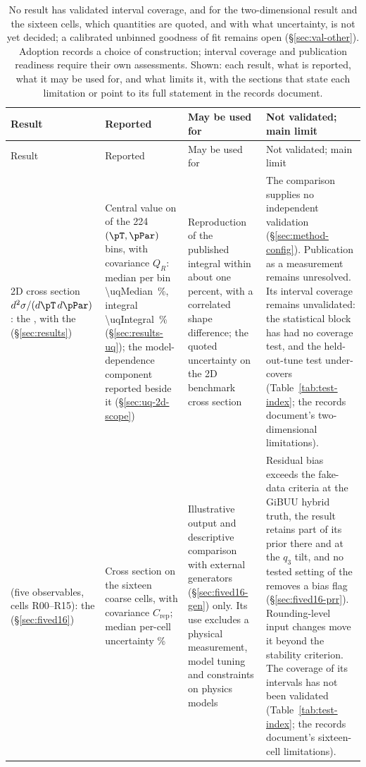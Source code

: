\begingroup\setlength{\LTcapwidth}{\textwidth}
\begin{xltabular}{\textwidth}{@{}>{\footnotesize\RaggedRight\arraybackslash{}\hsize}X>{\footnotesize\RaggedRight\arraybackslash{}\hsize}X>{\footnotesize\RaggedRight\arraybackslash{}\hsize}X>{\footnotesize\RaggedRight\arraybackslash{}\hsize}X@{}}
\caption[Results and their validity]{No result has validated interval coverage, and for the two-dimensional result and the sixteen cells, which quantities are quoted, and with what uncertainty, is not yet decided; a calibrated unbinned goodness of fit remains open (\S\ref{sec:val-other}). Adoption records a choice of construction; interval coverage and publication readiness require their own assessments. Shown: each result, what is reported, what it may be used for, and what limits it, with the sections that state each limitation or point to its full statement in the records document.}
\label{tab:validity}\label{tab:result-status}\\
\toprule Result & Reported & May be used for & Not validated; main limit \\
\midrule \endfirsthead \toprule Result & Reported & May be used for & Not validated; main limit \\
\midrule \endhead \bottomrule \endlastfoot 2D cross section $d^{2}\sigma/(d\pT\,d\pPar)$: the \estTwoD{}, with the \estExact{} (\S\ref{sec:results}) & Central value on  of the 224 $(\pT,\pPar)$ bins, with covariance $Q_R$: median per bin \SI{\uqMedian}{\percent}, integral \SI{\uqIntegral}{\percent} (\S\ref{sec:results-uq}); the model-dependence component reported beside it (\S\ref{sec:uq-2d-scope}) & Reproduction of the published integral within about one percent, with a correlated shape difference; the quoted uncertainty on the 2D benchmark cross section & The comparison supplies no independent validation (\S\ref{sec:method-config}). Publication as a measurement remains unresolved. Its interval coverage remains unvalidated: the statistical block has had no coverage test, and the held-out-tune test under-covers (Table~\ref{tab:test-index}; the records document's two-dimensional limitations). \\
\addlinespace \resSixteen{} (five observables, cells R00--R15): the \estMultiD{} (\S\ref{sec:fived16}) & Cross section on the sixteen coarse cells, with covariance $C_{\mathrm{rep}}$; median per-cell uncertainty \% & Illustrative output and descriptive comparison with external generators (\S\ref{sec:fived16-gen}) only. Its use excludes a physical measurement, model tuning and constraints on physics models & Residual bias exceeds the fake-data criteria at the GiBUU hybrid truth, the result retains part of its prior there and at the $q_3$ tilt, and no tested setting of the \estMultiD{} removes a bias flag (\S\ref{sec:fived16-prr}). Rounding-level input changes move it beyond the stability criterion. The coverage of its intervals has not been validated (Table~\ref{tab:test-index}; the records document's sixteen-cell limitations). \\

\end{xltabular}
